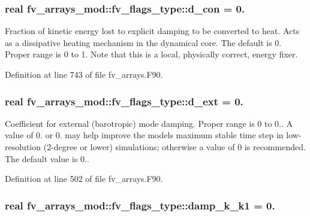 \subsubsection[{d\-\_\-con}]{\setlength{\rightskip}{0pt plus 5cm}real fv\-\_\-arrays\-\_\-mod\-::fv\-\_\-flags\-\_\-type\-::d\-\_\-con = 0.}\label{structfv__arrays__mod_1_1fv__flags__type_a548bc4f07258aa2cbf20fbcace2c52f8}


Fraction of kinetic energy lost to explicit damping to be converted to heat. Acts as a dissipative heating mechanism in the dynamical core. The default is 0. Proper range is 0 to 1. Note that this is a local, physically correct, energy fixer. 



Definition at line 743 of file fv\-\_\-arrays.\-F90.

\subsubsection[{d\-\_\-ext}]{\setlength{\rightskip}{0pt plus 5cm}real fv\-\_\-arrays\-\_\-mod\-::fv\-\_\-flags\-\_\-type\-::d\-\_\-ext = 0.}\label{structfv__arrays__mod_1_1fv__flags__type_a95caa816eb573eaf9bd1a8b388e87e30}


Coefficient for external (barotropic) mode damping. Proper range is 0 to 0.. A value of 0. or 0. may help improve the models maximum stable time step in low-\/resolution (2-\/degree or lower) simulations; otherwise a value of 0 is recommended. The default value is 0.. 



Definition at line 502 of file fv\-\_\-arrays.\-F90.

\subsubsection[{damp\-\_\-k\-\_\-k1}]{\setlength{\rightskip}{0pt plus 5cm}real fv\-\_\-arrays\-\_\-mod\-::fv\-\_\-flags\-\_\-type\-::damp\-\_\-k\-\_\-k1 = 0.}\label{structfv__arrays__mod_1_1fv__flags__type_a7a9b69cda3a1074c4d5bc3f9d1d7ed30}


